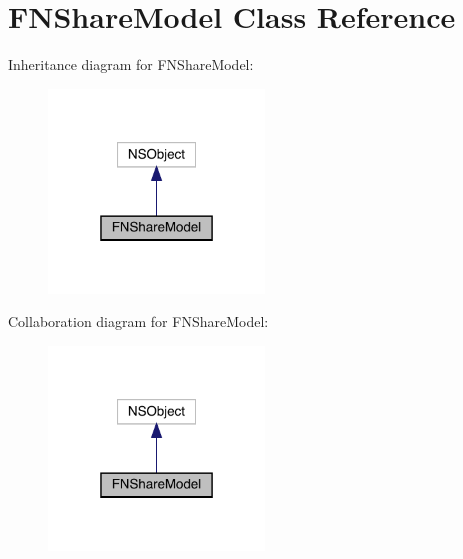 \hypertarget{interface_f_n_share_model}{}\section{F\+N\+Share\+Model Class Reference}
\label{interface_f_n_share_model}


Inheritance diagram for F\+N\+Share\+Model\+:\nopagebreak
\begin{figure}[H]
\begin{center}
\leavevmode
\includegraphics[width=163pt]{interface_f_n_share_model__inherit__graph}
\end{center}
\end{figure}


Collaboration diagram for F\+N\+Share\+Model\+:\nopagebreak
\begin{figure}[H]
\begin{center}
\leavevmode
\includegraphics[width=163pt]{interface_f_n_share_model__coll__graph}
\end{center}
\end{figure}
